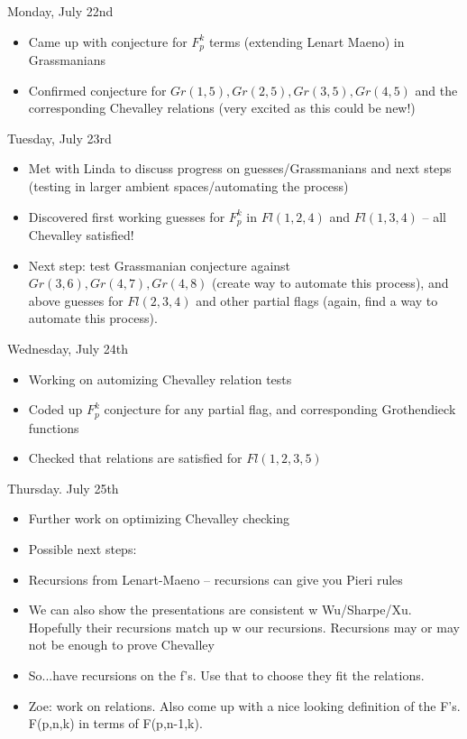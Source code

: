 Monday, July 22nd
\begin{itemize}
    \item Came up with conjecture for $F_p^k$ terms (extending Lenart Maeno) in Grassmanians
    \item Confirmed conjecture for $Gr(1, 5), Gr(2, 5), Gr(3, 5), Gr(4, 5)$ and the corresponding Chevalley relations (very excited as this could be new!)
\end{itemize}

Tuesday, July 23rd
\begin{itemize}
    \item Met with Linda to discuss progress on guesses/Grassmanians and next steps (testing in larger ambient spaces/automating the process)
    \item Discovered first working guesses for $F_p^k$ in $Fl(1, 2, 4)$ and $Fl(1, 3, 4)$ -- all Chevalley satisfied!
    \item Next step: test Grassmanian conjecture against $Gr(3, 6), Gr(4, 7), Gr(4, 8)$ (create way to automate this process), and above guesses for $Fl(2, 3, 4)$ and other partial flags (again, find a way to automate this process).
\end{itemize}

Wednesday, July 24th
\begin{itemize}
    \item Working on automizing Chevalley relation tests
    \item Coded up $F_p^k$ conjecture for any partial flag, and corresponding Grothendieck functions
    \item Checked that relations are satisfied for $Fl(1, 2, 3, 5)$
\end{itemize}

Thursday. July 25th
\begin{itemize}
    \item Further work on optimizing Chevalley checking
    \item Possible next steps:
    \item Recursions from Lenart-Maeno -- recursions can give you Pieri rules
    \item We can also show the presentations are consistent w Wu/Sharpe/Xu. Hopefully their recursions match up w our recursions. Recursions may or may not be enough to prove Chevalley
    \item So...have recursions on the f's. Use that to choose they fit the relations.
    \item Zoe: work on relations. Also come up with a nice looking definition of the F's. F(p,n,k) in terms of F(p,n-1,k). 
\end{itemize}

